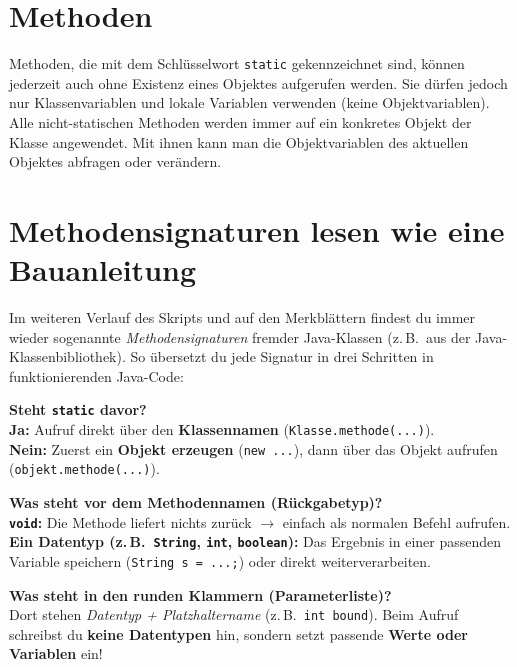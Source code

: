 \section{Methoden}

Methoden, die mit dem Schlüsselwort \lstinline|static| gekennzeichnet sind,
können jederzeit auch ohne Existenz eines Objektes aufgerufen werden. Sie
dürfen jedoch nur Klassenvariablen und lokale Variablen verwenden (keine Objektvariablen).
Alle nicht-statischen Methoden werden immer auf ein konkretes Objekt der Klasse
angewendet. Mit ihnen kann man die Objektvariablen des aktuellen Objektes
abfragen oder verändern.


\section{Methodensignaturen lesen wie eine Bauanleitung}

Im weiteren Verlauf des Skripts und auf den Merkblättern findest du immer wieder
sogenannte \emph{Methodensignaturen} fremder Java-Klassen (z.\,B.\ aus der
Java-Klassenbibliothek). So übersetzt du jede Signatur in drei Schritten in
funktionierenden Java-Code:

\begin{compactenum}[1.]
  \item \textbf{Steht \lstinline|static| davor?}\\
  \textbf{Ja:} Aufruf direkt über den \textbf{Klassennamen}
  (\lstinline|Klasse.methode(...)|).\\
  \textbf{Nein:} Zuerst ein \textbf{Objekt erzeugen} (\lstinline|new ...|),
  dann über das Objekt aufrufen (\lstinline|objekt.methode(...)|).

  \item \textbf{Was steht vor dem Methodennamen (Rückgabetyp)?}\\
  \textbf{\lstinline|void|:} Die Methode liefert nichts zurück $\rightarrow$
  einfach als normalen Befehl aufrufen.\\
  \textbf{Ein Datentyp (z.\,B.\ \lstinline|String|, \lstinline|int|,
  \lstinline|boolean|):} Das Ergebnis in einer passenden Variable speichern
  (\lstinline|String s = ...;|) oder direkt weiterverarbeiten.

  \item \textbf{Was steht in den runden Klammern (Parameterliste)?}\\
  Dort stehen \emph{Datentyp + Platzhaltername} (z.\,B.\ \lstinline|int bound|).
  Beim Aufruf schreibst du \textbf{keine Datentypen} hin, sondern setzt passende
  \textbf{Werte oder Variablen} ein!
\end{compactenum}

